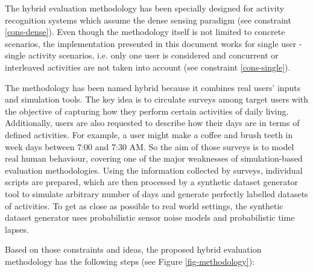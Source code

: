 \begin{comment}
 - Describe target scenario: dense sensing, single user - single activity
 - Explain in detail the steps: survey, script writing, sensor modelling, synthetic dataset generator 
\end{comment}

The hybrid evaluation methodology has been specially designed for activity recognition systems which assume the dense sensing paradigm (see constraint \ref{cons-dense}). Even though the methodology itself is not limited to concrete scenarios, the implementation presented in this document works for single user - single activity scenarios, i.e. only one user is considered and concurrent or interleaved activities are not taken into account (see constraint \ref{cons-single}). 

The methodology has been named hybrid because it combines real users’ inputs and simulation tools. The key idea is to circulate surveys among target users with the objective of capturing how they perform certain activities of daily living. Additionally, users are also requested to describe how their days are in terms of defined activities. For example, a user might make a coffee and brush teeth in week days between 7:00 and 7:30 AM. So the aim of those surveys is to model real human behaviour, covering one of the major weaknesses of simulation-based evaluation methodologies. Using the information collected by surveys, individual scripts are prepared, which are then processed by a synthetic dataset generator tool to simulate arbitrary number of days and generate perfectly labelled datasets of activities. To get as close as possible to real world settings, the synthetic dataset generator uses probabilistic sensor noise models and probabilistic time lapses.

Based on those constraints and ideas, the proposed hybrid evaluation methodology has the following steps (see Figure \ref{fig-methodology}):

